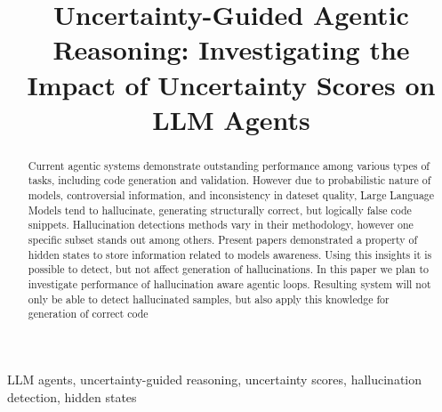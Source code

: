 \documentclass[conference]{IEEEtran}
\newcommand{\ProposalTitle}{Uncertainty-Guided Agentic Reasoning: Investigating the Impact of Uncertainty Scores on LLM Agents}
\begin{document}
\title{\ProposalTitle}

\author{
\and
{}
}

\maketitle

\begin{abstract}
Current agentic systems demonstrate outstanding performance
among various types of tasks, including code generation and validation.
However due to probabilistic nature of models, controversial information, and inconsistency in dateset
quality, Large Language Models tend to hallucinate, generating structurally 
correct, but logically false code snippets. Hallucination detections methods
vary in their methodology, however one specific subset stands out among others.
Present papers demonstrated a property of hidden states to store information
related to models awareness. Using this insights it is possible to detect,
but not affect generation of hallucinations. In this paper we plan to investigate
performance of hallucination aware agentic loops. Resulting system will not only
be able to detect hallucinated samples, but also apply this knowledge for 
generation of correct code
\end{abstract}

\begin{IEEEkeywords}
LLM agents, uncertainty-guided reasoning, uncertainty scores, hallucination detection,
hidden states
\end{IEEEkeywords}











\end{document}
